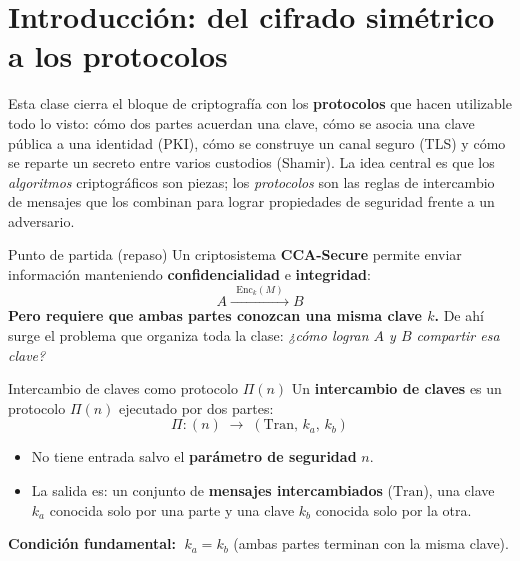\documentclass[11pt,a4paper]{article}
\begin{document}
\tableofcontents
\newpage

\section{Introducción: del cifrado simétrico a los protocolos}

Esta clase cierra el bloque de criptografía con los \textbf{protocolos} que hacen utilizable
todo lo visto: cómo dos partes acuerdan una clave, cómo se asocia una clave pública a una
identidad (PKI), cómo se construye un canal seguro (TLS) y cómo se reparte un secreto entre
varios custodios (Shamir). La idea central es que los \emph{algoritmos} criptográficos son
piezas; los \emph{protocolos} son las reglas de intercambio de mensajes que los combinan para
lograr propiedades de seguridad frente a un adversario.

\begin{defbox}{Punto de partida (repaso)}
Un criptosistema \textbf{CCA-Secure} permite enviar información manteniendo
\textbf{confidencialidad} e \textbf{integridad}:
\[
  A \xrightarrow{\;\;\mathrm{Enc}_k(M)\;\;} B
\]
\textbf{Pero requiere que ambas partes conozcan una misma clave $k$.} De ahí surge el
problema que organiza toda la clase: \emph{¿cómo logran $A$ y $B$ compartir esa clave?}
\end{defbox}

\begin{defbox}{Intercambio de claves como protocolo $\Pi(n)$}
Un \textbf{intercambio de claves} es un protocolo $\Pi(n)$ ejecutado por dos partes:
\[
  \Pi : (n) \;\to\; (\mathrm{Tran},\, k_a,\, k_b)
\]
\begin{itemize}[leftmargin=1.4em,itemsep=1pt]
  \item No tiene entrada salvo el \textbf{parámetro de seguridad} $n$.
  \item La salida es: un conjunto de \textbf{mensajes intercambiados} ($\mathrm{Tran}$), una
        clave $k_a$ conocida solo por una parte y una clave $k_b$ conocida solo por la otra.
\end{itemize}
\textbf{Condición fundamental:} $\;k_a = k_b$ (ambas partes terminan con la misma clave).
\end{defbox}
\end{document}
